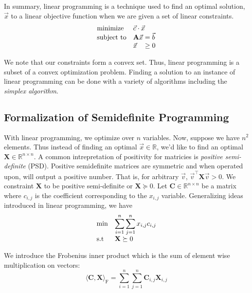 \documentclass{article}
\begin{document}
In summary, linear programming is a technique used to find an optimal solution, \( \vec{x} \) to a linear objective function when we are given a set of linear constraints.
\begin{align*}
  \begin{array}{ll@{}ll}
    \text{minimize}   & \vec{c} \cdot \vec{x}& \\
    \text{subject to} & \mathbf{A} \vec{x} &=  \vec{b} \\
                      & \vec{x} &\geq 0 \\
    \end{array}
\end{align*}

We note that our constraints form a convex set.
Thus, linear programming is a subset of a convex optimization problem.
Finding a solution to an instance of linear programming can be done with a variety of algorithms including the \emph{simplex algorithm}.

\subsection{Formalization of Semidefinite Programming}
With linear programming, we optimize over  \( n \) variables. Now, suppose we have \( n^2 \) elements. 
Thus instead of finding an optimal \( \vec{x} \in \mathbb{R} \), we'd like to find an optimal 
\( \mathbf{X} \in \mathbb{R}^{n \times n} \).
A common intrepretation of positivity for matricies is \emph{positive semi-definite} (PSD). 
Positive semidefinite matrices are symmetric and when operated upon, will output a positive number. That is, for 
arbitrary $\vec{v}$, $\vec{v}^\top\mathbf{X}\vec{v} > 0$.
We constraint \( \mathbf{X} \) to be positive semi-definite or \( \mathbf{X} \succeq 0 \).
Let \( \mathbf{C} \in \mathbb{R}^{n \times n}\) be a matrix where $c_{i,j}$ is the coefficient corresponding 
to the \( x_{i, j} \) variable.
Generalizing ideas introduced in linear programming, we have
\begin{align*}
  \begin{array}{ll@{}ll}
  \min & \displaystyle\sum\limits_{i=1}^{n}\sum\limits_{j=1}^{n} x_{i, j} c_{i , j} &\\
  \text{s.t} & \mathbf{X} \succeq 0 
  \end{array}
\end{align*}

We introduce the Frobenius inner product which is the sum of element wise multiplication on vectors:
\[
  \langle \mathbf{C}, \mathbf{X} \rangle_{\mathrm{F}} = \sum_{i = 1}^n \sum_{j = 1}^n \mathbf{C}_{i, j} \mathbf{X}_{i, j}
\]
\end{document}
